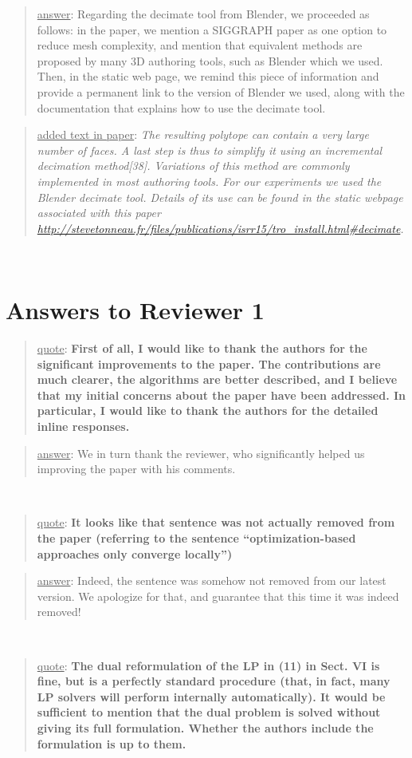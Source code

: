 \documentclass[a4paper]{article}
\newcommand{\ndone}[0]{\textcolor{red}{TODO}}
\newcommand\quot[1]{\begin{quote} \underline{quote}: \textbf{#1}\end{quote}}
\newcommand\as[1]{\begin{quote} \underline{answer}: {#1}\end{quote} }
\newcommand\qt[1]{\begin{quote} \underline{added text in paper}: \textit{#1}\end{quote} \leavevmode \\ }
\begin{document}
\as{Regarding the decimate tool from Blender, we proceeded as follows: in the paper, we mention a SIGGRAPH paper as one option to reduce mesh complexity, and mention that equivalent methods are proposed by many 3D authoring tools, such as Blender which we used. Then, in the static web page, we remind this piece of information and provide a permanent link to the version of Blender we used, along with the documentation that explains how to use the decimate tool.}

\qt{The resulting polytope can contain a very large number of faces.  A last step is thus to simplify it using an incremental decimation method[38].
Variations of this method are commonly implemented in most authoring tools. For our experiments we used the Blender decimate tool. Details of its use can be found in the static webpage associated with this paper \url{http://stevetonneau.fr/files/publications/isrr15/tro_install.html\#decimate}.\\}

\section{Answers to Reviewer 1}

\quot{First of all, I would like to thank the authors for the significant
improvements to the paper. The contributions are much clearer, the
algorithms are better described, and I believe that my initial concerns
about the paper have been addressed. In particular, I would like to
thank the authors for the detailed inline responses.}

\as{We in turn thank the reviewer, who significantly helped us improving the paper with his comments.}

\leavevmode \\
\quot {It looks like that sentence was not actually removed from the
paper (referring to the sentence ``optimization-based approaches
only converge locally'')
}

\as{Indeed, the sentence was somehow not removed from our latest version. We apologize for that, and guarantee that this time it was indeed removed!}

\leavevmode \\
\quot {
The dual reformulation of the LP in (11) in Sect. VI is fine, but is
a perfectly standard procedure (that, in fact, many LP solvers will
perform internally automatically). It would be sufficient to mention
that the dual problem is solved without giving its full formulation.
Whether the authors include the formulation is up to them.}
\end{document}
